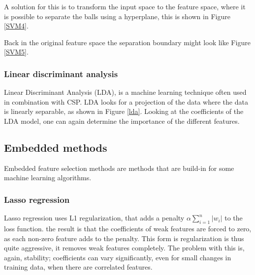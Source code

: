 
A solution for this is to transform the input space to the feature space, where it is possible to separate the balls using a hyperplane, this is shown in Figure \ref{SVM4}.


Back in the original feature space the separation boundary might look like Figure \ref{SVM5}.


\subsubsection{Linear discriminant analysis}
Linear Discriminant Analysis (LDA), is a machine learning technique often used in combination with CSP\cite{ErrorPotentials,svmldacomp,currTrends}. LDA looks for a projection of the data where the data is linearly separable, as shown in Figure \ref{lda}. Looking at the coefficients of the LDA model, one can again determine the importance of the different features.


\subsection{Embedded methods}
Embedded feature selection methods are methods that are build-in for some machine learning algorithms.

\subsubsection{Lasso regression}
Lasso regression uses L1 regularization, that adds a penalty $\alpha\sum\limits_{i=1}^{n} |w_i|$ to the loss function. the result is that the coefficients of weak features are forced to zero, as each non-zero feature adds to the penalty. This form is regularization is thus quite aggressive, it removes weak features completely. The problem with this is, again, stability; coefficients can vary significantly, even for small changes in training data, when there are correlated features.

